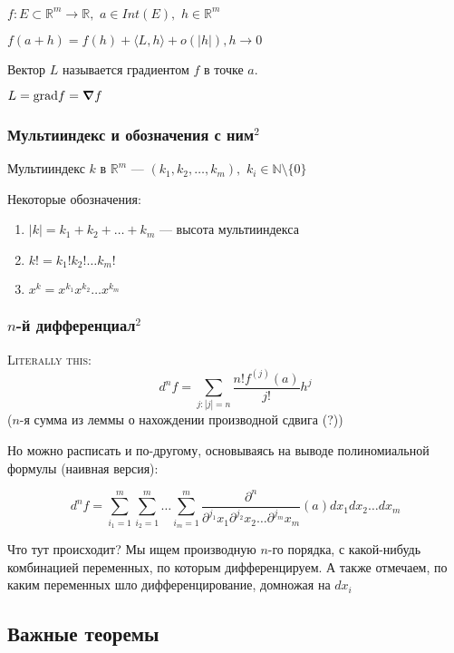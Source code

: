 \documentclass{article}
\def\dbl{\,\,}
\begin{document}
$f: E \subset \mathbb{R}^m \rightarrow \mathbb{R}, \dbl a \in Int(E), \dbl h \in \mathbb{R}^m$

$f(a + h) = f(h) + \langle L, h\rangle + o(|h|), h \rightarrow 0$

Вектор $L$ называется градиентом $f$ в точке $a$.

$L = \text{grad} f = \grad f$

\subsubsection{Мультииндекс и обозначения с ним\texorpdfstring{$^2$}{}}

Мультииндекс $k$ в $\mathbb{R}^m$ --- $(k_1, k_2, \ldots, k_m), \dbl k_i \in \mathbb{N} \setminus \{0\}$

Некоторые обозначения:

\begin{enumerate}
    \item $|k| = k_1 + k_2 + \ldots + k_m$ --- высота мультииндекса
    \item $k! = k_1!k_2!\ldots k_m!$
    \item $x^k = x^{k_1}x^{k_2}\ldots x^{k_m}$
\end{enumerate}

\subsubsection{\texorpdfstring{$n$}{n}-й дифференциал\texorpdfstring{$^2$}{}}

\textsc{Literally this: }
\[ d^n f = \sum_{j : |j| = n}{\frac{n! f^{(j)} (a)}{j!}}h^j \] ($n$-я сумма из леммы о нахождении производной сдвига (?))

Но можно расписать и по-другому, основываясь на выводе полиномиальной формулы (наивная версия):

\[d^n f = \sum_{i_1 = 1}^m \sum_{i_2 = 1}^m \dots \sum_{i_m = 1}^m \frac{\partial^n}{\partial^{j_1}{x_1}\partial^{j_2}{x_2}\ldots\partial^{j_m}{x_m}}(a)dx_1dx_2\ldots dx_m\]

Что тут происходит? Мы ищем производную $n$-го порядка, с какой-нибудь комбинацией переменных, по которым дифференцируем. А также отмечаем, по каким переменных шло дифференцирование, домножая на $dx_i$

\newpage
\subsection{Важные теоремы}
\end{document}
